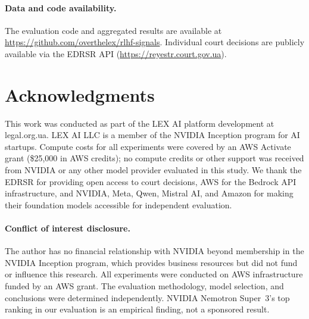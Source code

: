 \documentclass[11pt,a4paper]{article}
\begin{document}
\paragraph{Data and code availability.} The evaluation code and aggregated results are available at \url{https://github.com/overthelex/rlhf-signals}. Individual court decisions are publicly available via the EDRSR API (\url{https://reyestr.court.gov.ua}).

\section*{Acknowledgments}

This work was conducted as part of the LEX AI platform development at legal.org.ua. LEX AI LLC is a member of the NVIDIA Inception program for AI startups. Compute costs for all experiments were covered by an AWS Activate grant (\$25,000 in AWS credits); no compute credits or other support was received from NVIDIA or any other model provider evaluated in this study. We thank the EDRSR for providing open access to court decisions, AWS for the Bedrock API infrastructure, and NVIDIA, Meta, Qwen, Mistral AI, and Amazon for making their foundation models accessible for independent evaluation.

\paragraph{Conflict of interest disclosure.} The author has no financial relationship with NVIDIA beyond membership in the NVIDIA Inception program, which provides business resources but did not fund or influence this research. All experiments were conducted on AWS infrastructure funded by an AWS grant. The evaluation methodology, model selection, and conclusions were determined independently. NVIDIA Nemotron Super~3's top ranking in our evaluation is an empirical finding, not a sponsored result.
\end{document}
